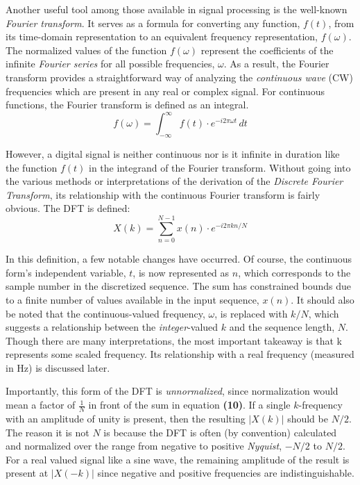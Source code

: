 \documentclass[reprint,amsmath,amssymb,aps,pra]{revtex4-2}
\begin{document}
Another useful tool among those available in signal processing is the well-known \textit{Fourier transform}. It serves as a formula for converting any function, $f(t)$, from its time-domain representation to an equivalent frequency representation, $f(\omega)$. The normalized values of the function $f(\omega)$ represent the coefficients of the infinite \textit{Fourier series} for all possible frequencies, $\omega$. As a result, the Fourier transform provides a straightforward way of analyzing the \textit{continuous wave} (CW) frequencies which are present in any real or complex signal. For continuous functions, the Fourier transform is defined as an integral.
\begin{equation}
    f(\omega) = \int_{-\infty}^\infty f(t)\cdot e^{-i2\pi\omega t} \,dt 
\end{equation}

However, a digital signal is neither continuous nor is it infinite in duration like the function $f(t)$ in the integrand of the Fourier transform. Without going into the various methods or interpretations of the derivation of the \textit{Discrete Fourier Transform}, its relationship with the continuous Fourier transform is fairly obvious. The DFT is defined:
\begin{equation}
    X(k) = \sum_{n=0}^{N-1}{x(n)\cdot e^{-i2\pi kn/N}}
\end{equation}

In this definition, a few notable changes have occurred. Of course, the continuous form's independent variable, $t$, is now represented as $n$, which corresponds to the sample number in the discretized sequence. The sum has constrained bounds due to a finite number of values available in the input sequence, $x(n)$. It should also be noted that the continuous-valued frequency, $\omega$, is replaced with $k/N$, which suggests a relationship between the \textit{integer}-valued $k$ and the sequence length, $N$. Though there are many interpretations, the most important takeaway is that k represents some scaled frequency. Its relationship with a real frequency (measured in Hz) is discussed later. 

Importantly, this form of the DFT is \textit{unnormalized}, since normalization would mean a factor of $\frac{1}{N}$ in front of the sum in equation \textbf{(10)}. If a single $k$-frequency with an amplitude of unity is present, then the resulting $|X(k)|$ should be $N/2$. The reason it is not $N$ is because the DFT is often (by convention) calculated and normalized over the range from negative to positive \textit{Nyquist}, $-N/2$ to $N/2$. For a real valued signal like a sine wave, the remaining amplitude of the result is present at $|X(-k)|$ since negative and positive frequencies are indistinguishable.
\end{document}
